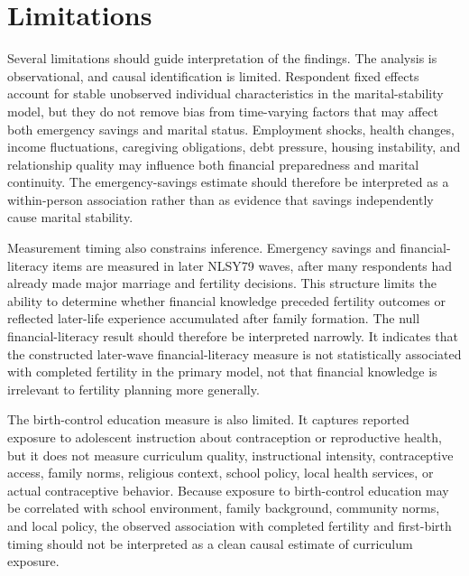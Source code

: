\documentclass[12pt]{article}
\begin{document}

\section{Limitations}

Several limitations should guide interpretation of the findings. The analysis is observational, and causal identification is limited. Respondent fixed effects account for stable unobserved individual characteristics in the marital-stability model, but they do not remove bias from time-varying factors that may affect both emergency savings and marital status. Employment shocks, health changes, income fluctuations, caregiving obligations, debt pressure, housing instability, and relationship quality may influence both financial preparedness and marital continuity. The emergency-savings estimate should therefore be interpreted as a within-person association rather than as evidence that savings independently cause marital stability.

Measurement timing also constrains inference. Emergency savings and financial-literacy items are measured in later NLSY79 waves, after many respondents had already made major marriage and fertility decisions. This structure limits the ability to determine whether financial knowledge preceded fertility outcomes or reflected later-life experience accumulated after family formation. The null financial-literacy result should therefore be interpreted narrowly. It indicates that the constructed later-wave financial-literacy measure is not statistically associated with completed fertility in the primary model, not that financial knowledge is irrelevant to fertility planning more generally.

The birth-control education measure is also limited. It captures reported exposure to adolescent instruction about contraception or reproductive health, but it does not measure curriculum quality, instructional intensity, contraceptive access, family norms, religious context, school policy, local health services, or actual contraceptive behavior. Because exposure to birth-control education may be correlated with school environment, family background, community norms, and local policy, the observed association with completed fertility and first-birth timing should not be interpreted as a clean causal estimate of curriculum exposure.
\end{document}
